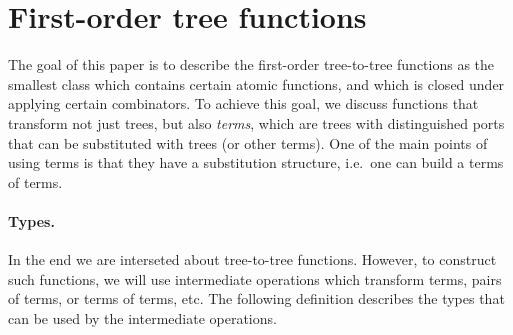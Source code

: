 
\section{First-order tree functions}
The goal of this paper is to describe the first-order tree-to-tree functions as the smallest class which contains certain atomic functions, and which is closed under applying certain combinators. To achieve this goal, we discuss functions that transform not just trees, but also \emph{terms}, which are trees with distinguished ports that can be substituted with trees (or other terms). One of the main points of using terms is that  they have a substitution structure, i.e.~one can build a terms of terms. 

\paragraph*{Types.} In the end we are interseted about tree-to-tree functions. However, to construct such functions, we will use intermediate operations which transform terms,  pairs of terms, or terms of terms, etc.
 The following definition describes the types that can be used by the intermediate operations.



